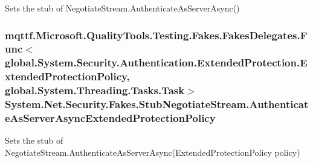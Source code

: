 Sets the stub of Negotiate\-Stream.\-Authenticate\-As\-Server\-Async()

\hypertarget{class_system_1_1_net_1_1_security_1_1_fakes_1_1_stub_negotiate_stream_a7eab91359dfab820d3248af4ce890731}{
\subsubsection[{Authenticate\-As\-Server\-Async\-Extended\-Protection\-Policy}]{\setlength{\rightskip}{0pt plus 5cm}mqttf.\-Microsoft.\-Quality\-Tools.\-Testing.\-Fakes.\-Fakes\-Delegates.\-Func$<$global.\-System.\-Security.\-Authentication.\-Extended\-Protection.\-Extended\-Protection\-Policy, global.\-System.\-Threading.\-Tasks.\-Task$>$ System.\-Net.\-Security.\-Fakes.\-Stub\-Negotiate\-Stream.\-Authenticate\-As\-Server\-Async\-Extended\-Protection\-Policy}}\label{class_system_1_1_net_1_1_security_1_1_fakes_1_1_stub_negotiate_stream_a7eab91359dfab820d3248af4ce890731}


Sets the stub of Negotiate\-Stream.\-Authenticate\-As\-Server\-Async(\-Extended\-Protection\-Policy policy)

